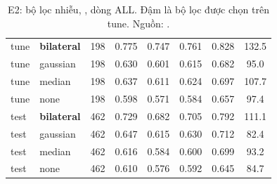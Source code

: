 \begin{table}[htbp]
\centering
\caption[E2: bộ lọc nhiễu, ]{E2: bộ lọc nhiễu, , dòng ALL. Đậm là bộ lọc được chọn trên tune. Nguồn: .}
\label{tab:e2}
\small
{}
\begin{tabularx}{\textwidth}{llCCCCCC}
\hline
{}  &  &  &  &  &  &  &  \\
\hline
tune & \textbf{bilateral} & 198 & 0.775 & 0.747 & 0.761 & 0.828 & 132.5 \\
tune & gaussian & 198 & 0.630 & 0.601 & 0.615 & 0.682 & 95.0 \\
tune & median & 198 & 0.637 & 0.611 & 0.624 & 0.697 & 107.7 \\
tune & none & 198 & 0.598 & 0.571 & 0.584 & 0.657 & 97.4 \\
\hline
test & \textbf{bilateral} & 462 & 0.729 & 0.682 & 0.705 & 0.792 & 111.1 \\
test & gaussian & 462 & 0.647 & 0.615 & 0.630 & 0.712 & 82.4 \\
test & median & 462 & 0.616 & 0.584 & 0.600 & 0.699 & 93.2 \\
test & none & 462 & 0.610 & 0.576 & 0.592 & 0.645 & 84.7 \\
\hline
\end{tabularx}
\end{table}
